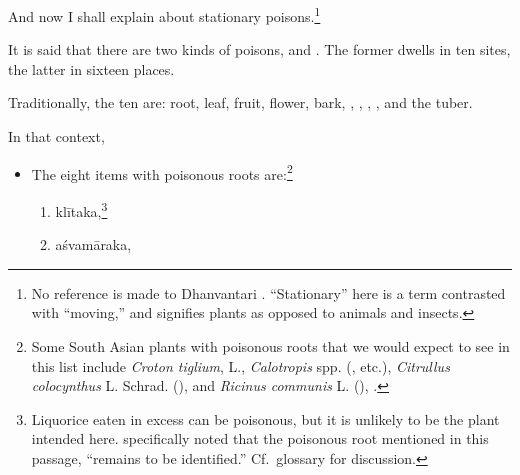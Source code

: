 \begin{translation}
    
\item[1]

And now I shall explain 
about stationary poisons.\footnote{No reference is made to
    Dhanvantari \citep[see][]{birc-2021}. “Stationary” here is a term
    contrasted with “moving,” and signifies plants as opposed to animals
    and insects.}
  
    \item[3]
    \noindent It is said that there are two kinds of poisons,
     and . The former
    dwells in ten sites, the latter in sixteen places.
   
    \item[4]
    Traditionally, the ten are: root, leaf, fruit, flower, bark,
    , , , 
    , and the tuber.

    \item[5]
    
    In that context,\label{poisonousplants}
    \begin{itemize}
        \item[A] The eight items with poisonous roots are:\footnote{Some South 
        Asian
    plants with poisonous roots that we would expect to see in
    this list include \emph{Croton tiglium}, L., \emph{Calotropis}
    spp. (, etc.), \emph{Citrullus colocynthus} L. Schrad. 
    (), and
    \emph{Ricinus communis} L. (), \citep{pill-2010}.} %
        \begin{enumerate}
            
        \item  \gls{klītaka},\footnote{Liquorice eaten in excess can
    be poisonous, but it is unlikely to be the plant intended
    here.  \citet[124]{gvdb} specifically noted that the poisonous root
    mentioned in this passage, “remains to be identified.” Cf.\ glossary for 
    discussion.}
       
        \item \gls{aśvamāraka},
    

\end{enumerate}
\end{itemize}
\end{translation}
